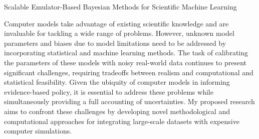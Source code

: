 \documentclass[11pt]{article}
\begin{document}
\begin{center}
Scalable Emulator-Based Bayesian Methods for Scientific Machine Learning
\end{center}

Computer models take advantage of existing scientific knowledge and are invaluable for tackling a wide range of problems. However, unknown model parameters and biases due to model limitations need to be addressed by incorporating statistical and machine learning methods. The task of calibrating the parameters of these models with noisy real-world data continues to present significant challenges, requiring tradeoffs between realism and computational and statistical feasibility. Given the ubiquity of computer models in informing evidence-based policy, it is essential to address these problems while simultaneously providing a full accounting of uncertainties. My proposed research aims to confront these challenges by developing novel methodological and computational approaches for integrating large-scale datasets with expensive computer simulations. 

\end{document}
